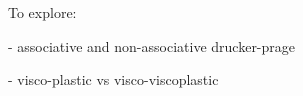 \newpage
To explore:

- associative and non-associative drucker-prage

- visco-plastic vs visco-viscoplastic











